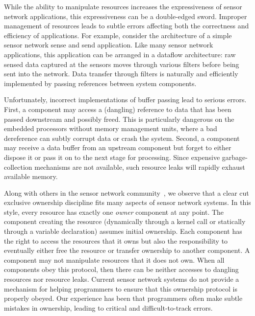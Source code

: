 While the ability to manipulate resources increases the expressiveness of
sensor network applications, this expressiveness can be a double-edged
sword.  
%
Improper management of resources leads to subtle errors affecting both the
correctness and efficiency of applications.
%
For example, consider the architecture of a simple sensor network sense and
send application.  
%
Like many sensor network applications, this application can be arranged in
a dataflow architecture:  raw sensed data captured at the sensors moves
through various filters before being sent into the network.  
%
Data transfer through filters is naturally and efficiently implemented by
passing references between system components.



Unfortunately, incorrect implementations of buffer passing lead to serious
errors.  
%
First, a component may access a (dangling) reference to data that has been
passed downstream and possibly freed.
%
This is particularly dangerous on the embedded processors without memory
management units, where a bad dereference can subtly corrupt data or crash
the system. 
%
Second, a component may receive a data buffer from an upstream component but
forget to either dispose it or pass it on to the next stage for processing.
%
Since expensive garbage-collection mechanisms are not available, such
resource leaks will rapidly exhaust available memory.



Along with others in the sensor network community~\cite{07interface,XXX}, we
observe that a clear cut exclusive ownership discipline fits many aspects of
sensor network systems.
%
In this style, every resource has exactly one {\em owner} component at any
point.  
%
The component creating the resource (dynamically through a kernel call or
statically through a variable declaration) assumes initial ownership.  
%
Each component has the right to access the resources that it owns but also
the responsibility to eventually either free the resource or transfer
ownership to another component.  
%
A component may not manipulate resources that it does not own.  
%
When all components obey this protocol, then there can be neither accesses
to dangling resources nor resource leaks.
%
Current sensor network systems do not provide a mechanism for helping
programmers to ensure that this ownership protocol is properly obeyed.  
%
Our experience has been that programmers often make subtle mistakes in
ownership, leading to critical and difficult-to-track errors.  



